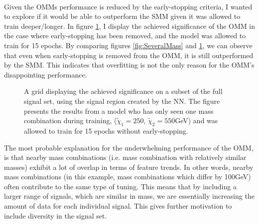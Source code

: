 \\
Given the \ac{OMM}s performance is reduced by the early-stopping criteria, I wanted to explore if it would be able to outperform the 
\ac{SMM} given it was allowed to train deeper/longer. In figure \ref{fig:NNOverfitting}, I display the achieved significance
of the \ac{OMM} in the case where early-stopping has been removed, and the model was allowed to train for 15 epochs. By comparing figures 
\ref{fig:SeveralMass} and \ref{fig:NNOverfitting}, we can observe that even when early-stopping is removed from the \ac{OMM}, it is  
still outperformed by the \ac{SMM}. This indicates that overfitting is not the only reason for the \ac{OMM}'s disappointing performance.\\
\begin{figure}
    \centering
    \caption[A grid displaying the achieved significance on a subset of the full signal set, using the signal region 
    created by a dense \ac{NN} which has trained on one mass, and has been allowed to train for 16 epochs.]{
    A grid displaying the achieved significance on a subset of the full signal set, using the signal region 
    created by the \ac{NN}. The figure presents the results from a model who has only seen one mass combination 
    during training, ($\tilde{\chi}_1=250$, $\tilde{\chi}_2=550$GeV) and was allowed to train for 15 epochs without 
    early-stopping.}
    \label{fig:NNOverfitting}
\end{figure}
The most probable explanation for the underwhelming performance of the \ac{OMM}, is that nearby mass combinations (i.e. mass combination with 
relatively similar masses) exhibit a lot of overlap in terms of feature trends. In other words, nearby mass combinations (in this example, mass combinations which 
differ by 100GeV) often contribute to the same type of tuning. This means that by including a larger range of signals, which are similar in mass, we are 
essentially increasing the amount of data for each individual signal. This gives further motivation to include diversity in the signal set.